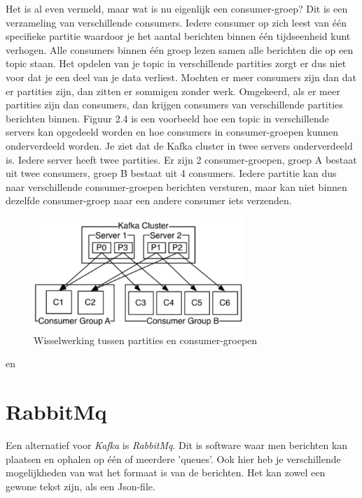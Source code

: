 Het is al even vermeld, maar wat is nu eigenlijk een consumer-groep? Dit is een verzameling van verschillende consumers. Iedere consumer op zich leest van één specifieke partitie waardoor je het aantal berichten binnen één tijdseenheid kunt verhogen. Alle consumers binnen één groep lezen samen alle berichten die op een topic staan. Het opdelen van je topic in verschillende partities zorgt er dus niet voor dat je een deel van je data verliest. Mochten er meer consumers zijn dan dat er partities zijn, dan zitten er sommigen zonder werk. Omgekeerd, als er meer partities zijn dan consumers, dan krijgen consumers van verschillende partities berichten binnen.  Figuur 2.4 is een voorbeeld hoe een topic in verschillende servers kan opgedeeld worden en hoe consumers in consumer-groepen kunnen onderverdeeld worden. Je ziet dat de Kafka cluster in twee servers onderverdeeld is. Iedere server heeft twee partities. Er zijn 2 consumer-groepen, groep A bestaat uit twee consumers, groep B bestaat uit 4 consumers. Iedere partitie kan dus naar verschillende consumer-groepen berichten versturen, maar kan niet binnen dezelfde consumer-groep naar een andere consumer iets verzenden. 

 \begin{figure}[h!]
    \centering
    \includegraphics[width=80mm]{../kafkaConsumers.png}
    \caption{Wisselwerking tussen partities en consumer-groepen}
    
\end{figure}

\autocite{Sookocheff2015} en \autocite{Johansson2016}

\section{RabbitMq}

Een alternatief voor \emph{Kafka} is \emph{RabbitMq}. Dit is software waar men berichten kan plaatsen en ophalen op één of meerdere 'queues'. Ook hier heb je verschillende mogelijkheden van wat het formaat is van de berichten. Het kan zowel een gewone tekst zijn, als een Json-file. 


